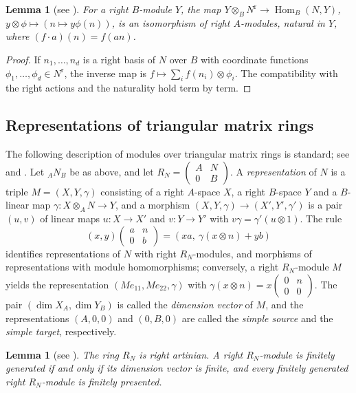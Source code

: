 \documentclass[11pt,a4paper]{amsart}
\newtheorem{lemma}[theorem]{Lemma}
\numberwithin{equation}{section}
\newcommand{\Hom}{\operatorname{Hom}}
\newcommand{\rr}{\mathrm{r}}
\begin{document}
\begin{lemma}[{see \cite{DR,Si81}}]\label{lem:adj}
For a right $B$-module $Y$, the map $Y\otimes_BN^{\rr}\to\Hom_B(N,Y)$, $y\otimes\phi\mapsto(n\mapsto y\phi(n))$, is an isomorphism of right $A$-modules, natural in $Y$, where $(f\cdot a)(n)=f(an)$.
\end{lemma}

\begin{proof}
If $n_1,\dots,n_d$ is a right basis of $N$ over $B$ with coordinate functions $\phi_1,\dots,\phi_d\in N^{\rr}$, the inverse map is $f\mapsto\sum_if(n_i)\otimes\phi_i$. The compatibility with the right actions and the naturality hold term by term.
\end{proof}

\subsection{Representations of triangular matrix rings}\label{subsec:rep}

The following description of modules over triangular matrix rings is standard; see \cite{FGR} and \cite{DR}. Let ${}_AN_B$ be as above, and let $R_N=\left(\begin{smallmatrix}A&N\\0&B\end{smallmatrix}\right)$. A \emph{representation} of $N$ is a triple $M=(X,Y,\gamma)$ consisting of a right $A$-space $X$, a right $B$-space $Y$ and a $B$-linear map $\gamma\colon X\otimes_AN\to Y$, and a morphism $(X,Y,\gamma)\to(X',Y',\gamma')$ is a pair $(u,v)$ of linear maps $u\colon X\to X'$ and $v\colon Y\to Y'$ with $v\gamma=\gamma'(u\otimes1)$. The rule
\[
(x,y)\begin{pmatrix}a&n\\0&b\end{pmatrix}=(xa,\ \gamma(x\otimes n)+yb)
\]
identifies representations of $N$ with right $R_N$-modules, and morphisms of representations with module homomorphisms; conversely, a right $R_N$-module $M$ yields the representation $(Me_{11},Me_{22},\gamma)$ with $\gamma(x\otimes n)=x\left(\begin{smallmatrix}0&n\\0&0\end{smallmatrix}\right)$. The pair $(\dim X_A,\dim Y_B)$ is called the \emph{dimension vector} of $M$, and the representations $(A,0,0)$ and $(0,B,0)$ are called the \emph{simple source} and the \emph{simple target}, respectively.

\begin{lemma}[{see \cite{FGR}}]\label{lem:artinian}
The ring $R_N$ is right artinian. A right $R_N$-module is finitely generated if and only if its dimension vector is finite, and every finitely generated right $R_N$-module is finitely presented.
\end{lemma}
\end{document}
